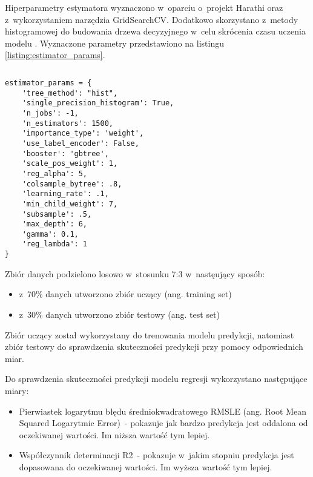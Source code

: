 Hiperparametry estymatora wyznaczono w~oparciu o~projekt Harathi \cite{harathi-2018} oraz z~wykorzystaniem narzędzia GridSearchCV.
Dodatkowo skorzystano z~metody histogramowej do budowania drzewa decyzyjnego w~celu skrócenia czasu uczenia modelu \cite{golarnyk-2021}.
Wyznaczone parametry przedstawiono na listingu \ref{listing:estimator_params}.


\noindent\begin{minipage}{\textwidth}
             \begin{lstlisting}[caption={Parametry estmatora}, label={listing:estimator_params}]
             \end{lstlisting}
             \hspace{.075\textwidth}\begin{minipage}{.85\textwidth}
                                        \begin{verbatim}
estimator_params = {
    'tree_method': "hist",
    'single_precision_histogram': True,
    'n_jobs': -1,
    'n_estimators': 1500,
    'importance_type': 'weight',
    'use_label_encoder': False,
    'booster': 'gbtree',
    'scale_pos_weight': 1,
    'reg_alpha': 5,
    'colsample_bytree': .8,
    'learning_rate': .1,
    'min_child_weight': 7,
    'subsample': .5,
    'max_depth': 6,
    'gamma': 0.1,
    'reg_lambda': 1
}
                                        \end{verbatim}
             \end{minipage}

             \raggedright\source{\ownwork}
             \vspace{0.75cm}
\end{minipage}

Zbiór danych podzielono losowo w~stosunku 7:3 w~nastęujący sposób:
\begin{itemize}
    \item z~70\% danych utworzono zbiór uczący (ang. training set)
    \item z~30\% danych utworzono zbiór testowy (ang. test set)
\end{itemize}

Zbiór uczący został wykorzystany do trenowania modelu predykcji, natomiast zbiór testowy do sprawdzenia skuteczności predykcji przy pomocy odpowiednich miar.

Do sprawdzenia skuteczności predykcji modelu regresji wykorzystano następujące miary:
\begin{itemize}
    \item Pierwiastek logarytmu błędu średniokwadratowego RMSLE (ang. Root Mean Squared Logarytmic Error)~- pokazuje jak bardzo predykcja jest oddalona od oczekiwanej wartości. Im niższa wartość tym lepiej.
    \item Współczynnik determinacji R2~- pokazuje w~jakim stopniu predykcja jest dopasowana do oczekiwanej wartości. Im wyższa wartość tym lepiej.
\end{itemize}

